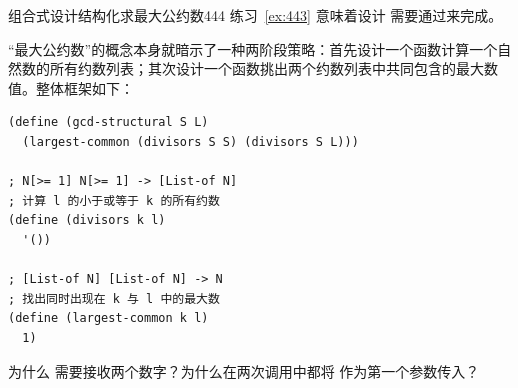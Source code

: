 \begin{exercise}{组合式设计结构化求最大公约数}{444}\label{ex:444}
练习~\ref{ex:443} 意味着设计  需要通过来完成。

“最大公约数”的概念本身就暗示了一种两阶段策略：首先设计一个函数计算一个自然数的所有约数列表；其次设计一个函数挑出两个约数列表中共同包含的最大数值。整体框架如下：

\begin{lstlisting}[language=BSL]
(define (gcd-structural S L)
  (largest-common (divisors S S) (divisors S L)))

; N[>= 1] N[>= 1] -> [List-of N]
; 计算 l 的小于或等于 k 的所有约数
(define (divisors k l)
  '())

; [List-of N] [List-of N] -> N
; 找出同时出现在 k 与 l 中的最大数
(define (largest-common k l)
  1)
\end{lstlisting}

为什么  需要接收两个数字？为什么在两次调用中都将  作为第一个参数传入？
\end{exercise}
